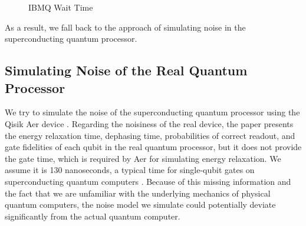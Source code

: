 \begin{figure}[H]
    \centering
    \caption{IBMQ Wait Time}
    \label{fig:ibmq-wait-time}
\end{figure}

As a result, we fall back to the approach of simulating noise in the superconducting quantum processor. 

\subsection{Simulating Noise of the Real Quantum Processor}
We try to simulate the noise of the superconducting quantum processor using the Qisik Aer device \cite{aer}. Regarding the noisiness of the real device, the paper presents the energy relaxation time, dephasing time, probabilities of correct readout, and gate fidelities of each qubit in the real quantum processor, but it does not provide the gate time, which is required by Aer for simulating energy relaxation. We assume it is 130 nanoseconds, a typical time for single-qubit gates on superconducting quantum computers \cite{linke2017experimental}. Because of this missing information and the fact that we are unfamiliar with the underlying mechanics of physical quantum computers, the noise model we simulate could potentially deviate significantly from the actual quantum computer.

